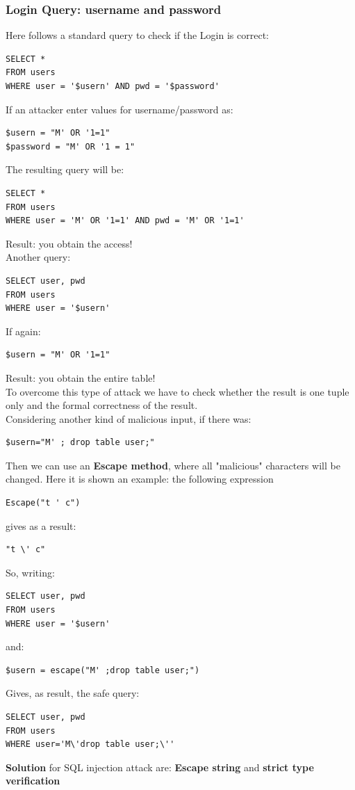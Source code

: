 \subsubsection{Login Query: username and password} 
Here follows a standard query to check if the Login is correct:
\begin{lstlisting}
SELECT * 
FROM users 
WHERE user = '$usern' AND pwd = '$password'
\end{lstlisting}
If an attacker enter values for username/password as:
\begin{lstlisting}
$usern = "M' OR '1=1"
$password = "M' OR '1 = 1"
\end{lstlisting}
The resulting query will be:
\begin{lstlisting}
SELECT * 
FROM users 
WHERE user = 'M' OR '1=1' AND pwd = 'M' OR '1=1'
\end{lstlisting}
Result: you obtain the access!\\
Another query:
\begin{lstlisting}
SELECT user, pwd 
FROM users 
WHERE user = '$usern' 
\end{lstlisting}
If again:
\begin{lstlisting}
$usern = "M' OR '1=1" 
\end{lstlisting}
Result: you obtain the entire table!\\
To overcome this type of attack we have to check whether the result is one tuple only and the formal correctness of the result. \\
\linebreak
Considering another kind of malicious input, if there was:  
\begin{lstlisting} 
$usern="M' ; drop table user;"
\end{lstlisting}
Then we can use an \textbf{Escape method}, where all "malicious" characters will be changed.
Here it is shown an example: the following expression
\begin{lstlisting} 
Escape("t ' c") 
\end{lstlisting}
gives as a result:
\begin{lstlisting} 
"t \' c"
\end{lstlisting}
So, writing:
\begin{lstlisting} 
SELECT user, pwd 
FROM users 
WHERE user = '$usern'
\end{lstlisting}
and:
\begin{lstlisting} 
$usern = escape("M' ;drop table user;")
\end{lstlisting}
Gives, as result, the safe query:
\begin{lstlisting} 
SELECT user, pwd 
FROM users 
WHERE user='M\'drop table user;\''
\end{lstlisting}
\textbf{Solution} for SQL injection attack are: \textbf{Escape string} and \textbf{strict type verification}